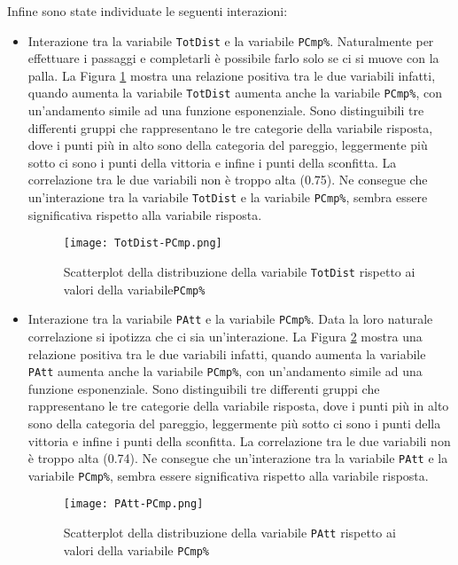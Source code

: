 Infine sono state individuate le seguenti interazioni:
\begin{itemize}
	\item Interazione tra la variabile \texttt{TotDist} e la variabile \texttt{PCmp\%}. Naturalmente per effettuare i passaggi e completarli è possibile farlo solo se ci si muove con la palla. La Figura \ref{fig:totdistpcmp} mostra una relazione positiva tra le due variabili infatti, quando aumenta la variabile \texttt{TotDist} aumenta anche la variabile \texttt{PCmp\%}, con un'andamento simile ad una funzione esponenziale. Sono distinguibili tre differenti gruppi che rappresentano le tre categorie della variabile risposta, dove i punti più in alto sono della categoria del pareggio, leggermente più sotto ci sono i punti della vittoria e infine i punti della sconfitta. La correlazione tra le due variabili non è troppo alta (0.75). Ne consegue che un'interazione tra la variabile \texttt{TotDist} e la variabile \texttt{PCmp\%}, sembra essere significativa rispetto alla variabile risposta.
	
	\begin{figure}[htbp]
		\begin{center}
			\texttt{[image: TotDist-PCmp.png]}
			\caption{Scatterplot della distribuzione della variabile \texttt{TotDist} rispetto ai valori della variabile\texttt{PCmp\%}}  \label{fig:totdistpcmp}
		\end{center}
	\end{figure}
	\item Interazione tra la variabile \texttt{PAtt} e la variabile \texttt{PCmp\%}. Data la loro naturale correlazione si ipotizza che ci sia un'interazione. La Figura \ref{fig:pp} mostra una relazione positiva tra le due variabili infatti, quando aumenta la variabile \texttt{PAtt} aumenta anche la variabile \texttt{PCmp\%}, con un'andamento simile ad una funzione esponenziale. Sono distinguibili tre differenti gruppi che rappresentano le tre categorie della variabile risposta, dove i punti più in alto sono della categoria del pareggio, leggermente più sotto ci sono i punti della vittoria e infine i punti della sconfitta. La correlazione tra le due variabili non è troppo alta (0.74). Ne consegue che un'interazione tra la variabile \texttt{PAtt} e la variabile \texttt{PCmp\%}, sembra essere significativa rispetto alla variabile risposta.
	
	\begin{figure}[htbp]
		\begin{center}
			\texttt{[image: PAtt-PCmp.png]}
			\caption{Scatterplot della distribuzione della variabile \texttt{PAtt} rispetto ai valori della variabile \texttt{PCmp\%}}  \label{fig:pp}
		\end{center}
	\end{figure}
	

\end{itemize}

